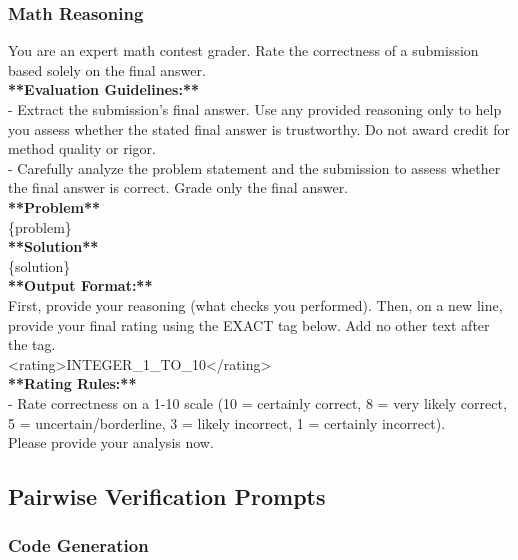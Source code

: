 \subsubsection{Math Reasoning}

\begin{tcolorbox}[
    colback=promptbg,
    colframe=promptborder,
    title={\textbf{Pointwise Math Verification Prompt}},
    coltitle=white,
    fonttitle=\small\bfseries,
    breakable,
    enhanced
]
\small
\ttfamily
You are an expert math contest grader. Rate the correctness of a submission based solely on the final answer.\\[0.5em]
\textbf{**Evaluation Guidelines:**}\\
- Extract the submission's final answer. Use any provided reasoning only to help you assess whether the stated final answer is trustworthy. Do not award credit for method quality or rigor.\\
- Carefully analyze the problem statement and the submission to assess whether the final answer is correct. Grade only the final answer.\\[0.5em]
\textbf{**Problem**}\\
\{problem\}\\[0.5em]
\textbf{**Solution**}\\
\{solution\}\\[0.5em]
\textbf{**Output Format:**}\\
First, provide your reasoning (what checks you performed). Then, on a new line, provide your final rating using the EXACT tag below. Add no other text after the tag.\\
<rating>INTEGER\_1\_TO\_10</rating>\\[0.5em]
\textbf{**Rating Rules:**}\\
- Rate correctness on a 1-10 scale (10 = certainly correct, 8 = very likely correct, 5 = uncertain/borderline, 3 = likely incorrect, 1 = certainly incorrect).\\
Please provide your analysis now.
\end{tcolorbox}

\subsection{Pairwise Verification Prompts}

\subsubsection{Code Generation}

